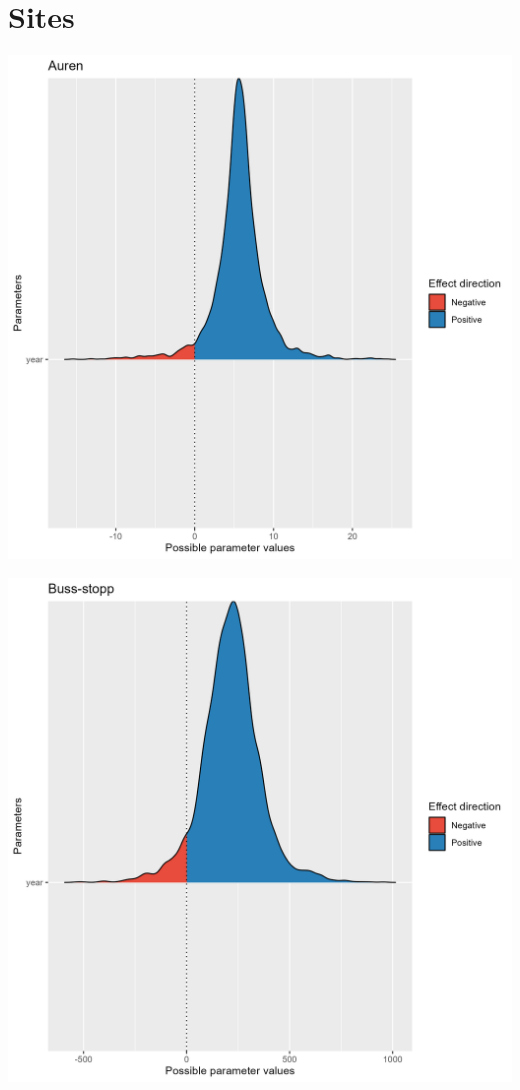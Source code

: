 \documentclass[
  letterpaper,
  DIV=11,
  numbers=noendperiod]{scrreport}
\begin{document}
\hypertarget{sites-2}{%
\section{Sites}\label{sites-2}}

\includegraphics{data/derived_data/direction_plots/plots/Auren.png}

\includegraphics{data/derived_data/direction_plots/plots/Buss-stopp.png}
\end{document}
